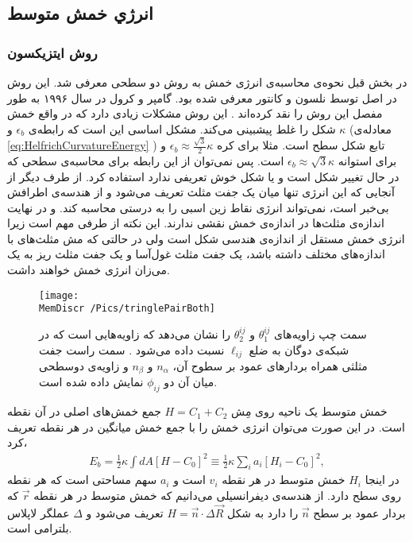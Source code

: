 \setRL



\subsection{
انرژي خمش متوسط
}
\subsubsection{
روش ایتزیکسون
}
در بخش قبل نحوه‌ی محاسبه‌ی انرژی خمش به روش دو سطحی
معرفی شد. این روش در اصل توسط نلسون و کانتور
\cite{NelsonPRL1987}
معرفی شده بود. گامپر و کرول در سال ۱۹۹۶ به طور مفصل این روش را نقد کرده‌اند
\cite{Gompper1996}
. این روش مشکلات زیادی دارد که در واقع خمش شکل را غلط پیشبینی می‌کند. مشکل اساسی این است که رابطه‌ی 
$\epsilon_b$
و 
$\kappa$
(معادله‌ی  
\ref{eq:HelfrichCurvatureEnergy}
) تابع شکل سطح است.  مثلا برای کره
$\epsilon_b\approx\frac{\sqrt{3}}{2}\kappa$
و برای استوانه
$\epsilon_b\approx\sqrt{3}\kappa$
است. پس نمی‌توان از این رابطه برای محاسبه‌ی سطحی که در حال تغییر شکل است و یا شکل خوش تعریفی ندارد استفاده کرد. 
از طرف دیگر از آنجایی که این انرژی تنها میان یک جفت مثلث تعریف می‌شود و از هندسه‌ی اطرافش بی‌خبر است، نمی‌تواند انرژی نقاط زین اسبی را به درستی محاسبه کند. و در نهایت اندازه‌ی مثلث‌ها در اندازه‌ی خمش نقشی ندارند. این نکته از طرفی مهم است زیرا انرژی خمش مستقل از اندازه‌ی هندسی شکل است ولی در حالتی که مش مثلث‌های با اندازه‌های مختلف داشته باشد، یک جفت مثلث غول‌آسا و یک جفت مثلث ریز به یک می‌زان انرژی خمش خواهند داشت.

\begin{figure}[h]
\begin{center}
\texttt{[image: \\MemDiscr /Pics/tringlePairBoth]}
\caption{
سمت چپ زاویه‌های 
$\theta_1^{ij}$
و
$\theta_2^{ij}$
را نشان می‌دهد که زاویه‌هایی است که در شبکه‌ی دوگان به ضلع
$\ell_{ij}$
نسبت داده می‌شود
\cite{Meyer2003}
. سمت راست جفت مثلثی همراه بردار‌های عمود بر سطوح آن،
$n_\alpha$
و
$n_\beta$
و زاویه‌ی دوسطحی میان آن دو
$\phi_{ij}$
نمایش داده شده ‌است.
}
\label{fig:trianglePairAngle}
\end{center}
\end{figure}


خمش متوسط یک ناحیه روی مِش 
$H=C_1+C_2$
جمع خمش‌های اصلی در آن نقطه است. در این صورت می‌توان انرژی خمش را با جمع خمش میانگین در هر نقطه تعریف کرد،
\begin{eqnarray}
E_{b}=\frac{1}{2}\kappa\int dA \left[H-C_0\right]^2\equiv\frac{1}{2}\kappa\sum_i a_i \left[H_i-C_0\right]^2,
\label{eq:bendingDiscretisation}
\end{eqnarray}
در اینجا 
$H_i$
خمش متوسط در هر نقطه 
$v_i$
است و 
$a_i$
سهم مساحتی است که هر نقطه روی سطح دارد. از هندسه‌ی دیفرانسیلی می‌دانیم که خمش متوسط در هر نقطه 
$\vec r$
که بردار عمود بر سطح 
$\vec n$
را دارد به شکل 
$H=\vec n\cdot\Delta \vec R$
تعریف می‌شود 
\cite{Gompper1996}
و 
$\Delta$
عملگر لاپلاس بلترامی 
است. 


